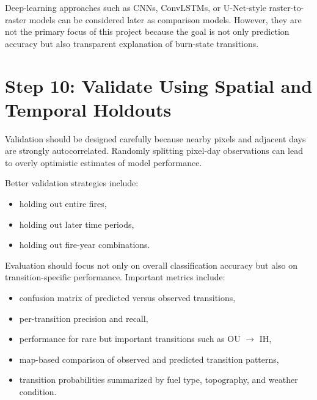 \documentclass[11pt]{article}
\begin{document}
Deep-learning approaches such as CNNs, ConvLSTMs, or U-Net-style raster-to-raster models can be considered later as comparison models. However, they are not the primary focus of this project because the goal is not only prediction accuracy but also transparent explanation of burn-state transitions.

\section{Step 10: Validate Using Spatial and Temporal Holdouts}

Validation should be designed carefully because nearby pixels and adjacent days are strongly autocorrelated. Randomly splitting pixel-day observations can lead to overly optimistic estimates of model performance.

Better validation strategies include:

\begin{itemize}
    \item holding out entire fires,
    \item holding out later time periods,
    \item holding out fire-year combinations.
\end{itemize}

Evaluation should focus not only on overall classification accuracy but also on transition-specific performance. Important metrics include:

\begin{itemize}
    \item confusion matrix of predicted versus observed transitions,
    \item per-transition precision and recall,
    \item performance for rare but important transitions such as OU $\rightarrow$ IH,
    \item map-based comparison of observed and predicted transition patterns,
    \item transition probabilities summarized by fuel type, topography, and weather condition.
\end{itemize}
\end{document}
